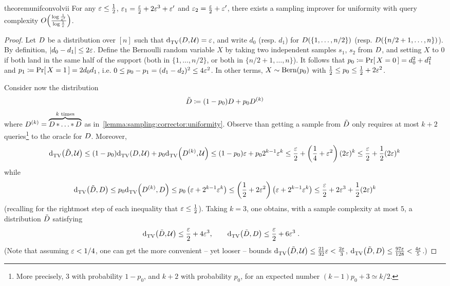 \begin{restatable}{theorem}{unifconvolvii}\label{lemma:sampling:corrector:uniformity:hybrid}
  For any $\varepsilon\leq \frac{1}{2}$, $\varepsilon_1=\frac{\varepsilon}{2}+2\varepsilon^3+\varepsilon^\prime$ and $\varepsilon_2=\frac{\varepsilon}{2}+\varepsilon^\prime$, there exists a sampling improver for uniformity with query complexity $\bigO{\frac{\log\frac{1}{\eps^\prime}}{\log\frac{1}{\eps}}}$.
\end{restatable}
\begin{proof}
Let $D$ be a distribution over $[n]$ such that ${\operatorname{d}_{\textrm{TV}}^{}\!\left({D, \mathcal{U}}\right)} = \varepsilon$, and write $d_0$ (resp. $d_1$) for $D(\{1,\dots,n/2\})$ (resp. $D(\{n/2+1,\dots,n\})$). By definition, $\left\lvert d_0-d_1 \right\rvert\leq 2\varepsilon$.
Define the Bernoulli random variable $X$ by taking two independent samples $s_1$, $s_2$ from $D$, and setting $X$ to $0$ if both land in the same half of the support (both in $\{1,\dots,n/2\}$, or both in $\{n/2+1,\dots,n\}$). It follows that 
$p_0\coloneqq \Pr\!\left[\, X=0\, \right] = d_0^2 + d_1^2$ and $p_1\coloneqq \Pr\!\left[\, X=1\, \right] = 2d_0d_1$, i.e. $0\leq p_0-p_1 = (d_1-d_2)^2 \leq 4\varepsilon^2$. In other terms, $X\sim \operatorname{Bern}\!\left( p_0 \right)$ with $\frac{1}{2}\leq p_0\leq \frac{1}{2}+2\varepsilon^2$.\medskip

\noindent Consider now the distribution
\[
    \tilde{\D} \eqdef (1-p_0)D + p_0 D^{(k)} \vspace{-\baselineskip}
\]
where $D^{(k)}=\overbrace{D\operatorname{\ast}\dots\operatorname{\ast} D}^{k\text{ times}}$ as in~\autoref{lemma:sampling:corrector:uniformity}. Observe than getting a sample from $\tilde{D}$ only requires at most $k+2$ queries\footnote{More precisely, $3$ with probability $1-p_0$, and $k+2$ with probability $p_0$, for an expected number $(k-1)p_0+3\simeq k/2$.} to the oracle for $D$. Moreover,
\[
  {\operatorname{d}_{\textrm{TV}}^{}\!\left({ \tilde{D} ,  \mathcal{U} }\right)} \leq (1-p_0){\operatorname{d}_{\textrm{TV}}^{}\!\left({D, \mathcal{U}}\right)} + p_0 {\operatorname{d}_{\textrm{TV}}^{}\!\left({ D^{(k)} , \mathcal{U}}\right)} \leq (1-p_0)\varepsilon + p_0 2^{k-1}\varepsilon^k
  \leq \frac{\varepsilon}{2} + \left(\frac{1}{4}+\varepsilon^2\right)(2\varepsilon)^k \leq \frac{\varepsilon}{2} + \frac{1}{2}(2\varepsilon)^k
\]
while
\[
  {\operatorname{d}_{\textrm{TV}}^{}\!\left({ \tilde{D} , D}\right)} \leq p_0{\operatorname{d}_{\textrm{TV}}^{}\!\left({ D^{(k)} , D}\right)}  \leq p_0\left( \varepsilon+2^{k-1}\varepsilon^k \right)\leq \left(\frac{1}{2}+2\varepsilon^2\right)\left( \varepsilon+2^{k-1}\varepsilon^k \right)
  \leq \frac{\varepsilon}{2} + 2\varepsilon^3 + \frac{1}{2}(2\varepsilon)^k
\]
(recalling for the rightmost step of each inequality that $\varepsilon \leq\frac{1}{2}$). Taking $k=3$, one obtains, with a sample complexity at most $5$, a distribution $\tilde{D}$ satisfying
\begin{align*}
  {\operatorname{d}_{\textrm{TV}}^{}\!\left({ \tilde{\ensuremath{D}} ,  \ensuremath{\mathcal{U}}}\right)} &\leq \frac{\varepsilon}{2} + 4\varepsilon^3, \qquad
  {\operatorname{d}_{\textrm{TV}}^{}\!\left({ \tilde{\ensuremath{D}} , \ensuremath{D}}\right)} \leq \frac{\varepsilon}{2}+6\varepsilon^3 \;.
\end{align*}
(Note that assuming $\varepsilon < 1/4$, one can get the more convenient -- yet looser -- bounds ${\operatorname{d}_{\textrm{TV}}^{}\!\left({ \tilde{D} ,  \mathcal{U} }\right)} \leq \frac{21}{32}\varepsilon < \frac{2\varepsilon}{3}$, ${\operatorname{d}_{\textrm{TV}}^{}\!\left({ \tilde{D} , D}\right)} \leq \frac{97\varepsilon}{128} < \frac{4\varepsilon}{5}$.)
\end{proof}

